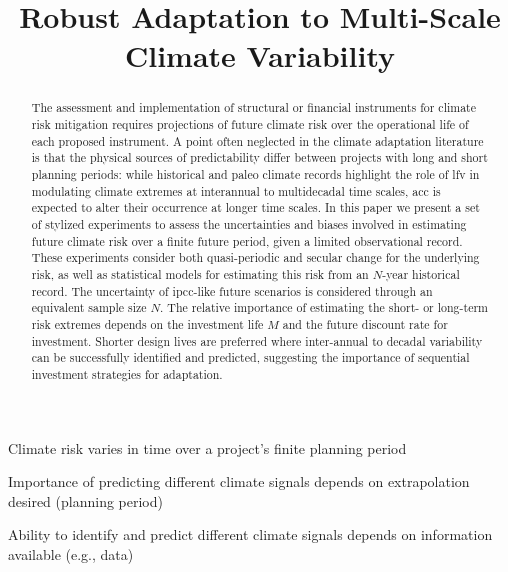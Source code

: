 \documentclass[
]{agujournal2018}
\makeatletter
\newcommand{\eg}{e.g.\@\xspace}
\makeatother
\begin{document}
\title{Robust Adaptation to Multi-Scale Climate Variability}

\begin{keypoints}
  \item Climate risk varies in time over a project's finite planning period
  \item Importance of predicting different climate signals depends on extrapolation desired (planning period)
  \item Ability to identify and predict different climate signals depends on information available (\eg, data)
\end{keypoints}

\begin{abstract}
  The assessment and implementation of structural or financial instruments for climate risk mitigation requires projections of future climate risk over the operational life of each proposed instrument.
  A point often neglected in the climate adaptation literature is that the physical sources of predictability differ between projects with long and short planning periods: while historical and paleo climate records highlight the role of \acrlong{lfv} in modulating climate extremes at interannual to multidecadal time scales, \acrlong{acc} is expected to alter their occurrence at longer time scales.
  In this paper we present a set of stylized experiments to assess the uncertainties and biases involved in estimating future climate risk over a finite future period, given a limited observational record.
  These experiments consider both quasi-periodic and secular change for the underlying risk, as well as statistical models for estimating this risk from an $N$-year historical record.
  The uncertainty of \acrshort{ipcc}-like future scenarios is considered through an equivalent sample size $N$. 
  The relative importance of estimating the short- or long-term risk extremes depends on the investment life $M$ and the future discount rate for investment.
  Shorter design lives are preferred where inter-annual to decadal variability can be successfully identified and predicted, suggesting the importance of sequential investment strategies for adaptation. 
\end{abstract}
\end{document}
